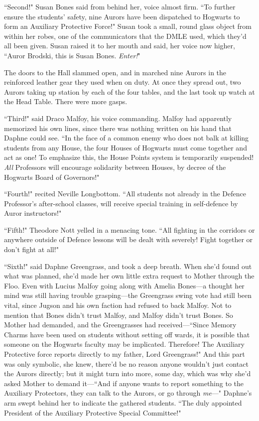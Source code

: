 ``Second!" Susan Bones said from behind her, voice almost firm. ``To further ensure the students' safety, nine Aurors have been dispatched to Hogwarts to form an Auxiliary Protective Force!" Susan took a small, round glass object from within her robes, one of the communicators that the DMLE used, which they'd all been given. Susan raised it to her mouth and said, her voice now higher, ``Auror Brodski, this is Susan Bones. \emph{Enter!}"

The doors to the Hall slammed open, and in marched nine Aurors in the reinforced leather gear they used when on duty. At once they spread out, two Aurors taking up station by each of the four tables, and the last took up watch at the Head Table. There were more gasps.

``Third!" said Draco Malfoy, his voice commanding. Malfoy had apparently memorized his own lines, since there was nothing written on his hand that Daphne could see. ``In the face of a common enemy who does not balk at killing students from any House, the four Houses of Hogwarts must come together and act as one! To emphasize this, the House Points system is temporarily suspended! \emph{All} Professors will encourage solidarity between Houses, by decree of the Hogwarts Board of Governors!"

``Fourth!" recited Neville Longbottom. ``All students not already in the Defence Professor's after-school classes, will receive special training in self-defence by Auror instructors!"

``Fifth!" Theodore Nott yelled in a menacing tone. ``All fighting in the corridors or anywhere outside of Defence lessons will be dealt with severely! Fight together or don't fight at all!"

``Sixth!" said Daphne Greengrass, and took a deep breath. When she'd found out what was planned, she'd made her own little extra request to Mother through the Floo. Even with Lucius Malfoy going along with Amelia Bones—a thought her mind was still having trouble grasping—the Greengrass swing vote had still been vital, since Jugson and his own faction had refused to back Malfoy. Not to mention that Bones didn't trust Malfoy, and Malfoy didn't trust Bones. So Mother had demanded, and the Greengrasses had received—``Since Memory Charms have been used on students without setting off wards, it is possible that someone on the Hogwarts faculty may be implicated. Therefore! The Auxiliary Protective force reports directly to my father, Lord Greengrass!" And this part was only symbolic, she knew, there'd be no reason anyone wouldn't just contact the Aurors directly; but it might turn into more, some day, which was why she'd asked Mother to demand it—``And if anyone wants to report something to the Auxiliary Protectors, they can talk to the Aurors, or go through \emph{me}—" Daphne's arm swept behind her to indicate the gathered students. ``The duly appointed President of the Auxiliary Protective Special Committee!"

